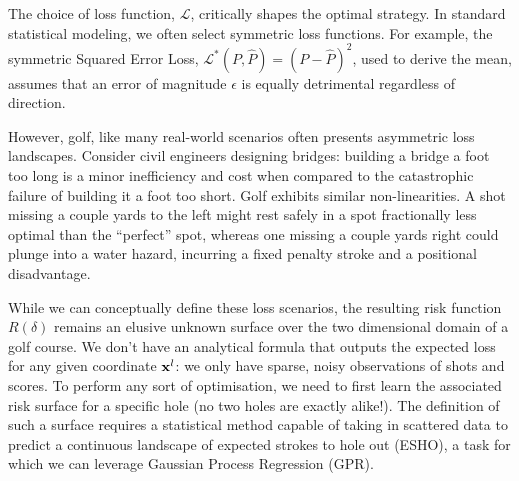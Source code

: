 \documentclass[11pt, letterpaper]{article}
\begin{document}
The choice of loss function, $\mathcal{L}$, critically shapes the optimal strategy. In standard statistical modeling, we often select symmetric loss functions. For example, the symmetric Squared Error Loss, $\mathcal{L}^*(P, \hat{P}) = (P - \hat{P})^2 $, used to derive the mean, assumes that an error of magnitude $\epsilon$ is equally detrimental regardless of direction. 

However, golf, like many real-world scenarios often presents asymmetric loss landscapes. Consider civil engineers designing bridges: building a bridge a foot too long is a minor inefficiency and cost when compared to the catastrophic failure of building it a foot too short. Golf exhibits similar non-linearities. A shot missing a couple yards to the left might rest safely in a spot fractionally less optimal than the ``perfect'' spot, whereas one missing a couple yards right could plunge into a water hazard, incurring a fixed penalty stroke and a positional disadvantage.

While we can conceptually define these loss scenarios, the resulting risk function $R(\delta)$ remains an elusive unknown surface over the two dimensional domain of a golf course. We don't have an analytical formula that outputs the expected loss for any given coordinate $\mathbf{x}^l$: we only have sparse, noisy observations of shots and scores. To perform any sort of optimisation, we need to first learn the associated risk surface for a specific hole (no two holes are exactly alike!). The definition of such a surface requires a statistical method capable of taking in scattered data to predict a continuous landscape of expected strokes to hole out (ESHO), a task for which we can leverage Gaussian Process Regression (GPR). 
\end{document}
